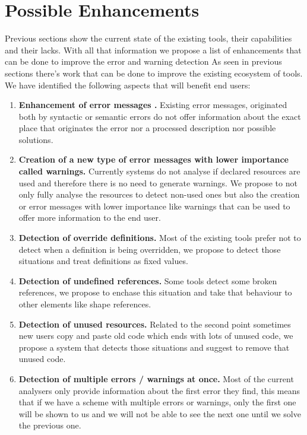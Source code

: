 \section{Possible Enhancements}\label{sec:anal-enhacements}
Previous sections show the current state of the existing tools, their capabilities and their lacks.
With all that information we propose a list of enhancements that can be done to improve the error and warning detection
As seen in previous sections there's work that can be done to improve the existing ecosystem of tools. We have identified the following aspects
that will benefit end users:

\begin{enumerate}
    \item \textbf{Enhancement of error messages \cite{heeren2005top}.} Existing error messages, originated both by syntactic or semantic errors do not offer information about
    the exact place that originates the error nor a processed description nor possible solutions.

    \item \textbf{Creation of a new type of error messages with lower importance called warnings.} Currently systems do not analyse if declared resources are
    used and therefore there is no need to generate warnings. We propose to not only fully analyse the resources to detect non-used ones but also the creation
    or error messages with lower importance like warnings that can be used to offer more information to the end user.

    \item \textbf{Detection of override definitions.} Most of the existing tools prefer not to detect when a definition is being overridden, we propose to detect those
    situations and treat definitions as fixed values.

    \item \textbf{Detection of undefined references.} Some tools detect some broken references, we propose to enchase this situation and take that behaviour to
    other elements like shape references.

    \item \textbf{Detection of unused resources.} Related to the second point sometimes new users copy and paste old code which ends with lots of unused code,
    we propose a system that detects those situations and suggest to remove that unused code.

    \item \textbf{Detection of multiple errors / warnings at once.} Most of the current analysers only provide information about the first error they find,
    this means that if we have a scheme with multiple errors or warnings, only the first one will be shown to us and we will not be able to see the next one
    until we solve the previous one. 
\end{enumerate}